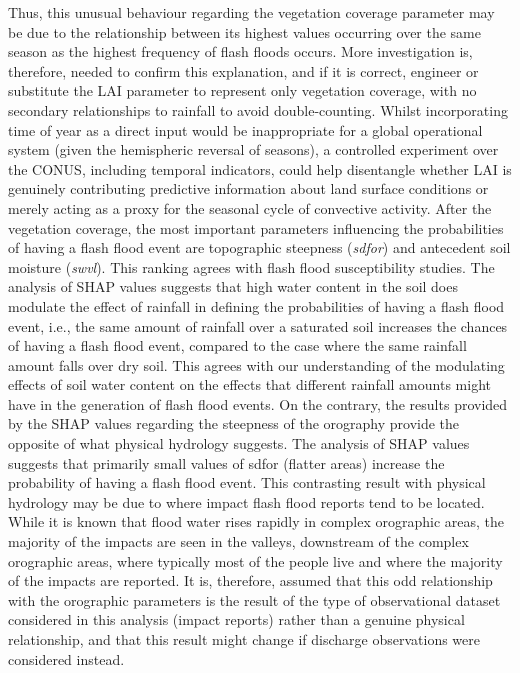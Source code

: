Thus, this unusual behaviour regarding the vegetation coverage parameter may be due to the relationship between its highest values occurring over the same season as the highest frequency of flash floods occurs. More investigation is, therefore, needed to confirm this explanation, and if it is correct, engineer or substitute the LAI parameter to represent only vegetation coverage, with no secondary relationships to rainfall to avoid double-counting. Whilst incorporating time of year as a direct input would be inappropriate for a global operational system (given the hemispheric reversal of seasons), a controlled experiment over the CONUS, including temporal indicators, could help disentangle whether LAI is genuinely contributing predictive information about land surface conditions or merely acting as a proxy for the seasonal cycle of convective activity. After the vegetation coverage, the most important parameters influencing the probabilities of having a flash flood event are topographic steepness (\textit{sdfor}) and antecedent soil moisture (\textit{swvl}). This ranking agrees with flash flood susceptibility studies. The analysis of SHAP values suggests that high water content in the soil does modulate the effect of rainfall in defining the probabilities of having a flash flood event, i.e., the same amount of rainfall over a saturated soil increases the chances of having a flash flood event, compared to the case where the same rainfall amount falls over dry soil. This agrees with our understanding of the modulating effects of soil water content on the effects that different rainfall amounts might have in the generation of flash flood events. On the contrary, the results provided by the SHAP values regarding the steepness of the orography provide the opposite of what physical hydrology suggests. The analysis of SHAP values suggests that primarily small values of sdfor (flatter areas) increase the probability of having a flash flood event. This contrasting result with physical hydrology may be due to where impact flash flood reports tend to be located. While it is known that flood water rises rapidly in complex orographic areas, the majority of the impacts are seen in the valleys, downstream of the complex orographic areas, where typically most of the people live and where the majority of the impacts are reported. It is, therefore, assumed that this odd relationship with the orographic parameters is the result of the type of observational dataset considered in this analysis (impact reports) rather than a genuine physical relationship, and that this result might change if discharge observations were considered instead. 

